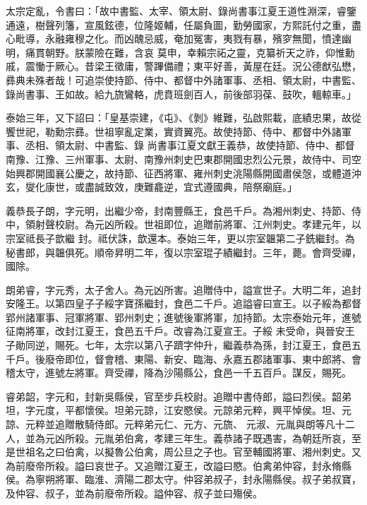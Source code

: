 \begin{pinyinscope}
 太宗定亂，令書曰：「故中書監、太宰、領太尉、錄尚書事江夏王道性淵深，睿鑒通遠，樹聲列籓，宣風鉉德，位隆姬輔，任屬負圖，勤勞國家，方熙託付之重，盡心毗導，永融雍穆之化。而凶醜忌威，奄加冤害，夷戮有暴，殯穸無聞，憤達幽明，痛貫朝野。朕蒙險在難，含哀
 莫申，幸賴宗祏之靈，克纂祈天之祚，仰惟勳戚，震慟于厥心。昔梁王徵庸，警蹕備禮；東平好善，黃屋在廷。況公德猷弘懋，彞典未殊者哉！可追崇使持節、侍中、都督中外諸軍事、丞相、領太尉，中書監、錄尚書事、王如故。給九旒鸞輅，虎賁班劍百人，前後部羽葆、鼓吹，轀輬車。」



 泰始三年，又下詔曰：「皇基崇建，《屯》、《剝》維難，弘啟熙載，底績忠果，故從饗世祀，勒勳宗彞。世祖寧亂定業，實資翼亮。故使持節、侍中、都督中外諸軍事、丞相、領太尉、中書監、錄
 尚書事江夏文獻王義恭，故使持節、侍中、都督南豫、江豫、三州軍事、太尉、南豫州刺史巴東郡開國忠烈公元景，故侍中、司空始興郡開國襄公慶之，故持節、征西將軍、雍州刺史洮陽縣開國肅侯愨，或體道沖玄，燮化康世，或盡誠致效，庚難龕逆，宜式遵國典，陪祭廟庭。」



 義恭長子朗，字元明，出繼少帝，封南豐縣王，食邑千戶。為湘州刺史、持節、侍中，領射聲校尉。為元凶所殺。世祖即位，追贈前將軍、江州刺史。孝建元年，以宗室祗長子歆繼
 封。祗伏誅，歆還本。泰始三年，更以宗室韞第二子銑繼封。為秘書郎，與韞俱死。順帝昇明二年，復以宗室琨子績繼封。三年，薨。會齊受禪，國除。



 朗弟睿，字元秀，太子舍人。為元凶所害。追贈侍中，謚宣世子。大明二年，追封安隆王。以第四皇子子綏字寶孫繼封，食邑二千戶。追謚睿曰宣王。以子綏為都督郢州諸軍事、冠軍將軍、郢州刺史；進號後軍將軍，加持節。太宗泰始元年，進號征南將軍，改封江夏王，食邑五千戶。改睿為江夏宣王。子綏
 未受命，與晉安王子勛同逆，賜死。七年，太宗以第八子躋字仲升，繼義恭為孫，封江夏王，食邑五千戶。後廢帝即位，督會稽、東陽、新安、臨海、永嘉五郡諸軍事、東中郎將、會稽太守，進號左將軍。齊受禪，降為沙陽縣公，食邑一千五百戶。謀反，賜死。



 睿弟韶，字元和，封新吳縣侯，官至步兵校尉。追贈中書侍郎，謚曰烈侯。韶弟坦，字元度，平都懷侯。坦弟元諒，江安愍侯。元諒弟元粹，興平悼侯。坦、元諒、元粹並追贈散騎侍郎。元粹弟元仁、元方、元旒、
 元淑、元胤與朗等凡十二人，並為元凶所殺。元胤弟伯禽，孝建三年生。義恭諸子既遇害，為朝廷所哀，至是世祖名之曰伯禽，以擬魯公伯禽，周公旦之子也。官至輔國將軍、湘州刺史。又為前廢帝所殺。謚曰哀世子。又追贈江夏王，改謚曰愍。伯禽弟仲容，封永脩縣侯。為寧朔將軍、臨淮、濟陽二郡太守。仲容弟叔子，封永陽縣侯。叔子弟叔寶，及仲容、叔子，並為前廢帝所殺。謚仲容、叔子並曰殤侯。




\end{pinyinscope}
